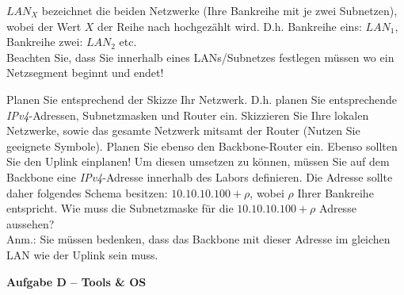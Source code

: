 \documentclass[paper=a4,fontsize=11pt]{scrartcl}%
\numberwithin{equation}{section}
\begin{document}
$LAN_X$ bezeichnet die beiden Netzwerke (Ihre Bankreihe mit je zwei Subnetzen), wobei der Wert $X$ der Reihe nach hochgezählt wird. D.h. Bankreihe eins: $LAN_{1}$, Bankreihe zwei: $LAN_{2}$ etc.\\ Beachten Sie, dass Sie innerhalb eines LANs/Subnetzes festlegen müssen wo ein Netzsegment beginnt und endet! 
	\begin{tasks}
		\task Planen Sie entsprechend der Skizze Ihr Netzwerk. D.h. planen Sie entsprechende
		\emph{IPv4}-Adressen, Subnetzmasken und Router ein.
		\task Skizzieren Sie Ihre lokalen Netzwerke, sowie das gesamte Netzwerk mitsamt der Router (Nutzen Sie geeignete Symbole).
		\task Planen Sie ebenso den Backbone-Router ein.
		\task Ebenso sollten Sie den Uplink einplanen! Um diesen umsetzen zu können, müssen Sie 		
		auf dem Backbone eine \emph{IPv4}-Adresse innerhalb des Labors definieren. Die Adresse sollte daher folgendes Schema besitzen: $10.10.10. 100 + \rho$, wobei $\rho$ Ihrer Bankreihe entspricht.
		\task Wie muss die Subnetzmaske für die $10.10.10. 100 + \rho$ Adresse aussehen?\\
		Anm.: Sie müssen bedenken, dass das Backbone mit dieser Adresse im gleichen LAN wie der Uplink sein muss.
	\end{tasks}

\begin{center}
\Large{\textbf{Aufgabe D -- Tools \& OS}}
\end{center}
\vskip0.25in
\end{document}
